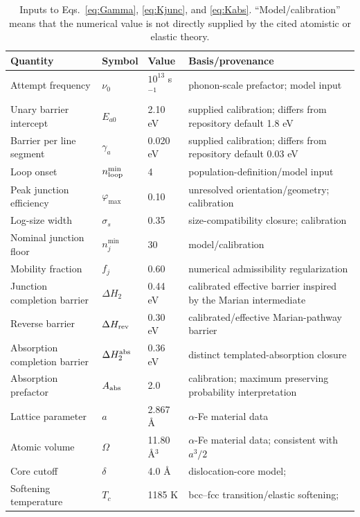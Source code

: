 \documentclass[11pt,a4paper]{article}
\begin{document}
\begin{table}[p]
\centering\small
\caption{Inputs to Eqs.~\eqref{eq:Gamma}, \eqref{eq:Kjunc}, and
\eqref{eq:Kabs}.  ``Model/calibration'' means that the numerical value is not
directly supplied by the cited atomistic or elastic theory.}
\label{tab:params}
\begin{tabular}{p{3.6cm}p{2.5cm}p{2.0cm}p{6.4cm}}
\toprule
Quantity & Symbol & Value & Basis/provenance \\
\midrule
Attempt frequency & $\nu_0$ & $10^{13}$ s$^{-1}$ & phonon-scale prefactor; model input \\
Unary barrier intercept & $E_{a0}$ & 2.10 eV & supplied calibration; differs from repository default 1.8 eV \\
Barrier per line segment & $\gamma_a$ & 0.020 eV & supplied calibration; differs from repository default 0.03 eV \\
Loop onset & $n_{\rm loop}^{\min}$ & 4 & population-definition/model input \\
Peak junction efficiency & $\varphi_{\max}$ & 0.10 & unresolved orientation/geometry; calibration \\
Log-size width & $\sigma_s$ & 0.35 & size-compatibility closure; calibration \\
Nominal junction floor & $n_j^{\min}$ & 30 & model/calibration \\
Mobility fraction & $f_j$ & 0.60 & numerical admissibility regularization \\
Junction completion barrier & $\Delta H_2$ & 0.44 eV & calibrated effective barrier inspired by the Marian intermediate \\
Reverse barrier & $\Delta H_{\rm rev}$ & 0.30 eV & calibrated/effective Marian-pathway barrier \\
Absorption completion barrier & $\Delta H_2^{\rm abs}$ & 0.36 eV & distinct templated-absorption closure \\
Absorption prefactor & $A_{\rm abs}$ & 2.0 & calibration; maximum preserving probability interpretation \\
Lattice parameter & $a$ & 2.867 \AA & $\alpha$-Fe material data \\
Atomic volume & $\Omega$ & 11.80 \AA$^3$ & $\alpha$-Fe material data; consistent with $a^3/2$ \\
Core cutoff & $\delta$ & 4.0 \AA & dislocation-core model; \citet{DudarevBullough2008} \\
Softening temperature & $T_c$ & 1185 K & bcc--fcc transition/elastic softening; \citet{DudarevBullough2008} \\

\end{tabular}
\end{table}
\end{document}
